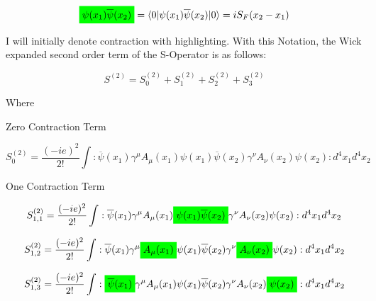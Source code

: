 \documentclass[a4]{article}
\newcommand{\highlight}[2][yellow]{\mathchoice
  {\colorbox{#1}{$\displaystyle#2$}}
  {\colorbox{#1}{$\textstyle#2$}}
  {\colorbox{#1}{$\scriptstyle#2$}}
  {\colorbox{#1}{$\scriptscriptstyle#2$}}}
\begin{document}
        \begin{equation}
            \highlight[green]{\psi (x_1) \overline{\psi} (x_2)} = \braket{0|\psi (x_1) \overline{\psi} (x_2)|0} = i S_{F} (x_2 - x_1)
        \end{equation}

        I will initially denote contraction with highlighting. With this Notation, the Wick expanded second order term of the S-Operator is as follows:

        \begin{equation}
            S^{(2)} = S^{(2)}_{0} + S^{(2)}_{1} + S^{(2)}_{2} + S^{(2)}_{3}
        \end{equation}

        Where

        \begin{framed}
            \begin{center}
                Zero Contraction Term
            \end{center}

            \begin{equation}
                S^{(2)}_{0} = \frac{(-ie)^2}{2!} \int :\overline{\psi} (x_1) \gamma^{\mu} A_{\mu} (x_1) \psi (x_1) \overline{\psi} (x_2) \gamma^{\nu} A_{\nu} (x_2) \psi (x_2): d^{4} x_{1} d^{4} x_{2}
            \end{equation}

            \begin{center}
                One Contraction Term
            \end{center}

            \begin{equation}
                S^{(2)}_{1,1} = \frac{(-ie)^2}{2!} \int :\overline{\psi} (x_1) \gamma^{\mu} A_{\mu} (x_1) \highlight[green]{\psi (x_1) \overline{\psi} (x_2)} \gamma^{\nu} A_{\nu} (x_2) \psi (x_2): d^{4} x_{1} d^{4} x_{2}
            \end{equation}

            \begin{equation}
                S^{(2)}_{1,2} = \frac{(-ie)^2}{2!} \int :\overline{\psi} (x_1) \gamma^{\mu} \highlight[green]{A_{\mu} (x_1)} \psi (x_1) \overline{\psi} (x_2) \gamma^{\nu} \highlight[green]{A_{\nu} (x_2)} \psi (x_2): d^{4} x_{1} d^{4} x_{2}
            \end{equation}

            \begin{equation}
                S^{(2)}_{1,3} = \frac{(-ie)^2}{2!} \int :\highlight[green]{\overline{\psi} (x_1)} \gamma^{\mu} A_{\mu} (x_1) \psi (x_1) \overline{\psi} (x_2) \gamma^{\nu} A_{\nu} (x_2) \highlight[green]{\psi (x_2)}: d^{4} x_{1} d^{4} x_{2}
            \end{equation}


\end{framed}
\end{document}
